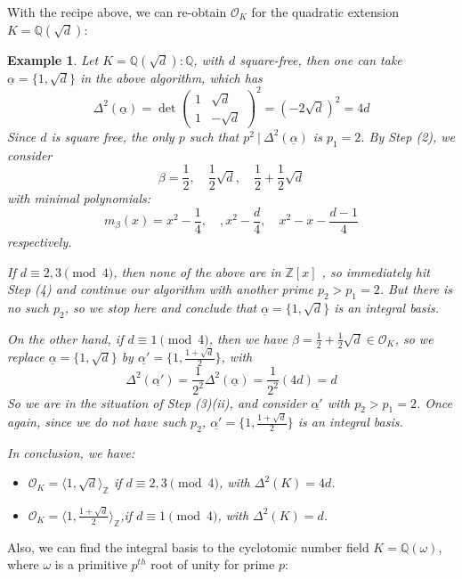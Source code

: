 \documentclass[11pt]{book}
\newtheorem{example}[theorem]{Example}
\begin{document}
\bigskip
With the recipe above, we can re-obtain $\mathcal{O}_K$ for the quadratic extension $K=\mathbb{Q}(\sqrt{d})$:
\begin{example}
    Let $K=\mathbb{Q}(\sqrt{d}):\mathbb{Q} $, with $d$ square-free, then one can take $\underline{\alpha} = \{1,\sqrt{d}\}$ in the above algorithm, which has
    $$\Delta^2(\underline{\alpha})= \det\begin{pmatrix}
        1 & \sqrt{d} \\ 1 & -\sqrt{d}
    \end{pmatrix}^2 = (-2\sqrt{d})^2 = 4d$$
    Since $d$ is square free, the only $p$ such that $p^2\ |\ \Delta^2(\underline{\alpha})$ is $p_1 = 2$. By Step (2), we consider
    $$\beta = \frac{1}{2}, \quad \frac{1}{2}\sqrt{d}, \quad \frac{1}{2} + \frac{1}{2}\sqrt{d}$$
    with minimal polynomials:
    $$m_{\beta}(x) = x^2-\frac{1}{4}, \quad, x^2-\frac{d}{4}, \quad x^2-x -\frac{d-1}{4}$$
    respectively. 
    
    If $d \equiv 2,3 \pmod{4}$, then none of the above are in $\mathbb{Z}[x]$ , so immediately hit Step (4) and continue our algorithm with another prime $p_2 > p_1 = 2$. But there is no such $p_2$, so we stop here and conclude that $\underline{\alpha} = \{1,\sqrt{d}\}$ is an integral basis.
    
    On the other hand, if $d \equiv 1 \pmod{4}$, then 
    we have $\beta = \frac{1}{2} + \frac{1}{2}\sqrt{d} \in \mathcal{O}_K$, so we replace $\underline{\alpha}=\{1,\sqrt{d}\}$ by $\underline{\alpha'}=\{1,\frac{1+\sqrt{d}}{2}\}$, with 
    $$\Delta^2(\underline{\alpha'})= \frac{1}{2^2}\Delta^2(\underline{\alpha}) = \frac{1}{2^2}(4d)= d$$
    So we are in the situation of Step (3)(ii), and consider $\underline{\alpha'}$ with $p_2 > p_1 = 2$. Once again, since we do not have such $p_2$, $\underline{\alpha'} = \{1,\frac{1+\sqrt{d}}{2}\}$ is an integral basis.

    In conclusion, we have:
    \begin{itemize}
        \item $\mathcal{O}_K=\langle1,\sqrt{d}\rangle_{\mathbb{Z}}$ if $d\equiv2,3 \pmod{4}$, with $\Delta^2(K) = 4d$.
        \item $\mathcal{O}_K=\langle 1,\frac{1+\sqrt{d}}{2}\rangle_{\mathbb{Z}}$,if $d\equiv 1 \pmod{4}$, with $\Delta^2(K) = d$.
    \end{itemize}


\end{example}
Also, we can find the integral basis to the cyclotomic number field $K=\mathbb{Q}(\omega)$, where $\omega$ is a primitive $p^{th}$ root of unity for prime $p$:
\end{document}
